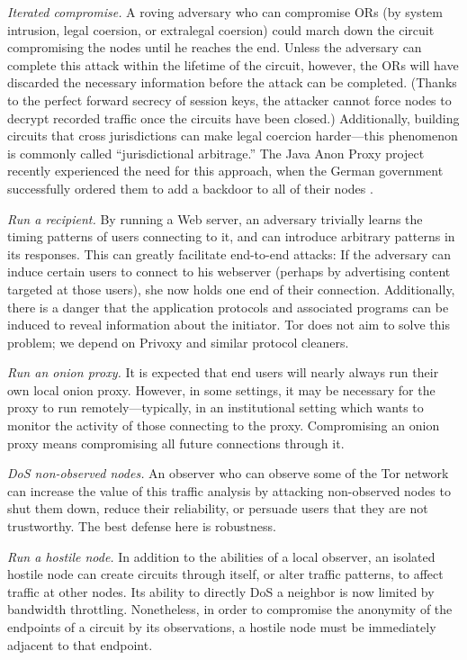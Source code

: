 \documentclass[times,10pt,twocolumn]{article}
\begin{document}
\emph{Iterated compromise.} A roving adversary who can
compromise ORs (by system intrusion, legal coersion, or extralegal
coersion) could march down the circuit compromising the
nodes until he reaches the end.  Unless the adversary can complete
this attack within the lifetime of the circuit, however, the ORs
will have discarded the necessary information before the attack can
be completed.  (Thanks to the perfect forward secrecy of session
keys, the attacker cannot force nodes to decrypt recorded
traffic once the circuits have been closed.)  Additionally, building
circuits that cross jurisdictions can make legal coercion
harder---this phenomenon is commonly called ``jurisdictional
arbitrage.'' The Java Anon Proxy project recently experienced the
need for this approach, when
the German government successfully ordered them to add a backdoor to
all of their nodes \cite{jap-backdoor}.

\emph{Run a recipient.} By running a Web server, an adversary
trivially learns the timing patterns of users connecting to it, and
can introduce arbitrary patterns in its responses.  This can greatly
facilitate end-to-end attacks: If the adversary can induce certain
users to connect to his webserver (perhaps by advertising
content targeted at those users), she now holds one end of their
connection.  Additionally, there is a danger that the application
protocols and associated programs can be induced to reveal
information about the initiator. Tor does not aim to solve this problem;
we depend on Privoxy and similar protocol cleaners.
  
\emph{Run an onion proxy.} It is expected that end users will
nearly always run their own local onion proxy. However, in some
settings, it may be necessary for the proxy to run
remotely---typically, in an institutional setting which wants
to monitor the activity of those connecting to the proxy.
Compromising an onion proxy means compromising all future connections
through it.

\emph{DoS non-observed nodes.} An observer who can observe some
of the Tor network can increase the value of this traffic analysis
by attacking non-observed nodes to shut them down, reduce
their reliability, or persuade users that they are not trustworthy.
The best defense here is robustness.
  
\emph{Run a hostile node.}  In addition to the abilities of a
local observer, an isolated hostile node can create circuits through
itself, or alter traffic patterns, to affect traffic at
other nodes. Its ability to directly DoS a neighbor is now limited
by bandwidth throttling. Nonetheless, in order to compromise the
anonymity of the endpoints of a circuit by its observations, a
hostile node must be immediately adjacent to that endpoint. 
  
\end{document}
